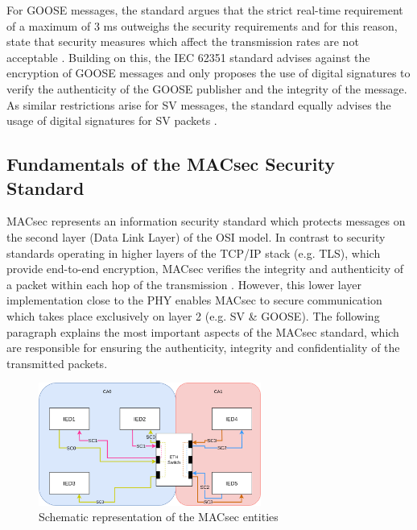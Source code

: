 \documentclass[conference, onecolumn, a4paper]{IEEEtran}
\begin{document}
\smallskip
For GOOSE messages, the standard argues that the strict real-time requirement of a maximum of 3 ms \cite{GOOSE_confidentiality_integrity:2020} outweighs 
the security requirements and for this reason, state that security measures which affect the transmission rates are not acceptable \cite{PoisonedGOOSE:2014}. 
Building on this, the IEC 62351 standard advises against the encryption of GOOSE messages and only proposes the use of digital signatures to verify the 
authenticity of the GOOSE publisher and the integrity of the message. As similar restrictions arise for SV messages, the standard equally advises the 
usage of digital signatures for SV packets \cite{Review_IEC62351:2019}. 

\subsection{Fundamentals of the MACsec Security Standard}
\noindent MACsec represents an information security standard which protects messages on the second layer (Data Link Layer) of the OSI model. In contrast 
to security standards operating in higher layers of the TCP/IP stack (e.g. TLS), which provide end-to-end encryption, MACsec verifies the integrity and 
authenticity of a packet within each hop of the transmission \cite{Cybersecurity_Substation:2016}. However, this lower layer implementation close to the 
PHY enables MACsec to secure communication which takes place exclusively on layer 2 (e.g. SV \& GOOSE). The following paragraph explains the most important 
aspects of the MACsec standard, which are responsible for ensuring the authenticity, integrity and confidentiality of the transmitted packets.

\begin{figure}[h]
    \centering
    \includegraphics[width=0.65\textwidth]{images/MACsec_Entities_Diagram.png}
    \caption{Schematic representation of the MACsec entities \cite{IEEE-802-1AE:2018}}
    \label{image:MACsecEntities}
\end{figure}
\end{document}
